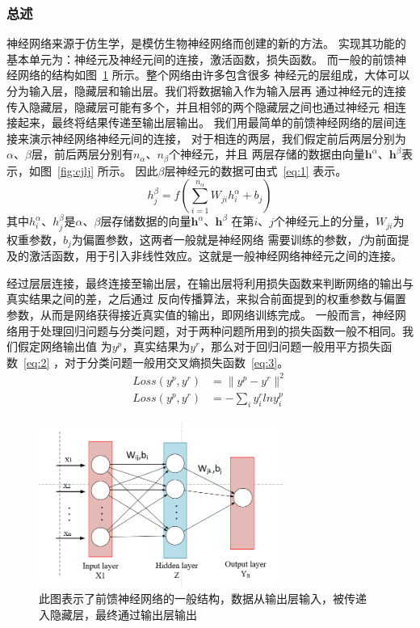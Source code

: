 \documentclass[aps,pre,12pt,preprint,onecolumn,showpacs,showkeys]{revtex4-1}
\begin{document}
\subsubsection{总述}
神经网络来源于仿生学，是模仿生物神经网络而创建的新的方法。
实现其功能的基本单元为：神经元及神经元间的连接，激活函数，损失函数。
而一般的前馈神经网络的结构如图~\ref{fig:cnn} 所示。整个网络由许多包含很多
神经元的层组成，大体可以分为输入层，隐藏层和输出层。我们将数据输入作为输入层再
通过神经元的连接传入隐藏层，隐藏层可能有多个，并且相邻的两个隐藏层之间也通过神经元
相连接起来，最终将结果传递至输出层输出。
我们用最简单的前馈神经网络的层间连接来演示神经网络神经元间的连接，
对于相连的两层，我们假定前后两层分别为
$\alpha$、$\beta$层，前后两层分别有$n_{\alpha}$、$n_{\beta}$个神经元，并且
两层存储的数据由向量$\bm h^{\alpha}$、$\bm h^{\beta}$表示，如图~\ref{fig:cjlj} 所示。
因此$\beta$层神经元的数据可由式~\ref{eq:1} 表示。
\begin{equation}
h_{j}^{\beta}=f(\sum_{i=1}^{n_{\alpha}}W_{ji}h_{i}^{\alpha}+b_{j}) \label{eq:1}
\end{equation}
其中$h_{i}^{\alpha}$、$h_{j}^{\beta}$是$\alpha$、$\beta$层存储数据的向量$\bm h^{\alpha}$、$\bm h^{\beta}$
在第$i$、$j$个神经元上的分量，$W_{ji}$为权重参数，$b_{j}$为偏置参数，这两者一般就是神经网络
需要训练的参数，$f$为前面提及的激活函数，用于引入非线性效应。这就是一般神经网络神经元之间的连接。\par
经过层层连接，最终连接至输出层，在输出层将利用损失函数来判断网络的输出与真实结果之间的差，之后通过
反向传播算法，来拟合前面提到的权重参数与偏置参数，从而是网络获得接近真实值的输出，即网络训练完成。
一般而言，神经网络用于处理回归问题与分类问题，对于两种问题所用到的损失函数一般不相同。我们假定网络输出值
为$y^{p}$，真实结果为$y^{r}$，那么对于回归问题一般用平方损失函数~\ref{eq:2} ，对于分类问题一般用交叉熵损失函数~\ref{eq:3}。
\begin{align}
Loss(y^{p},y^{r})&=\|y^{p}-y^{r}\|^{2} \label{eq:2} \\
Loss(y^{p},y^{r})&=-\sum_{i}y_{i}^{r}lny_{i}^{p} \label{eq:3}
\end{align}
\par
\begin{figure}[htbp]
\centering
\includegraphics[width=80mm]{CNN}
\caption{\label{fig:cnn}%
此图表示了前馈神经网络的一般结构，数据从输出层输入，被传递
入隐藏层，最终通过输出层输出}
\end{figure}
\end{document}
